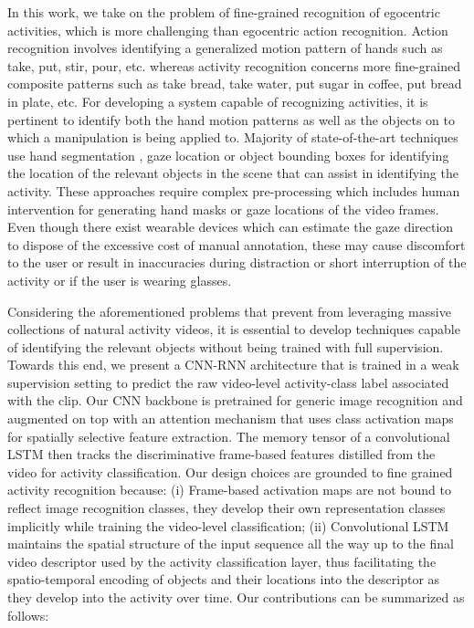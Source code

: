 \documentclass{bmvc2k}
\newcommand{\rev}[2]{#2}
\begin{document}
In this work, we take on the problem of fine-grained recognition of egocentric activities, which is more challenging than egocentric action recognition. Action recognition involves \rev{in}{} identifying a generalized motion pattern of hands such as take, put, stir, pour, etc. whereas activity recognition concerns more fine-grained \rev{problems}{composite patterns} such as take bread, take water, put sugar in coffee, put bread in plate, etc. For developing a system capable of recognizing activities, it is pertinent to identify both the hand motion patterns as well as the objects on to which \rev{the motion}{a manipulation} is being applied to. Majority of state-of-the-art techniques use hand segmentation \cite{ma2016deeper} \cite{li2015delving} \cite{singh2016first}, gaze location \cite{li2015delving} or object bounding boxes \cite{ma2016deeper} for identifying the location of the relevant objects in the scene that can assist in identifying the activity. These approaches require complex pre-processing which includes human intervention for generating hand masks or gaze locations of the video frames. Even though there exist wearable devices which can estimate the gaze direction \rev{}{to dispose of the excessive cost of manual annotation}, these may cause discomfort to the user or result in inaccuracies \rev{}{during distraction or short interruption of the activity or} if the user is wearing glasses. \rev{Considering the aforementioned problems, we propose a novel end-to-end trainable deep neural network for recognizing first-person activities which uses a spatial attention mechanism for detecting the location of the relevant object pattern in the scene that is a representative of the activity class.}{

    
Considering the aforementioned problems that prevent from leveraging massive collections of natural activity videos, it is \rev{imperative}{essential} to develop techniques capable of identifying the relevant objects without being trained with full supervision. Towards this end, we present a CNN-RNN architecture that is trained in a weak supervision setting to predict the raw video-level activity-class label associated with the clip. Our CNN backbone is pretrained for generic image recognition and augmented on top with an attention mechanism that uses class activation maps for spatially selective feature extraction. The memory tensor of a convolutional LSTM then tracks the discriminative frame-based features distilled from the video for activity classification. Our design choices are grounded to fine grained activity recognition because: (i) Frame-based activation maps are not bound to reflect image recognition classes, they develop their own representation classes implicitly while training the video-level classification; (ii) Convolutional LSTM maintains the spatial structure of the input sequence all the way up to the final video descriptor used by the activity classification layer, thus facilitating the spatio-temporal encoding of objects and their locations into the descriptor as they develop into the activity over time. Our contributions can be summarized as follows:}
\end{document}
